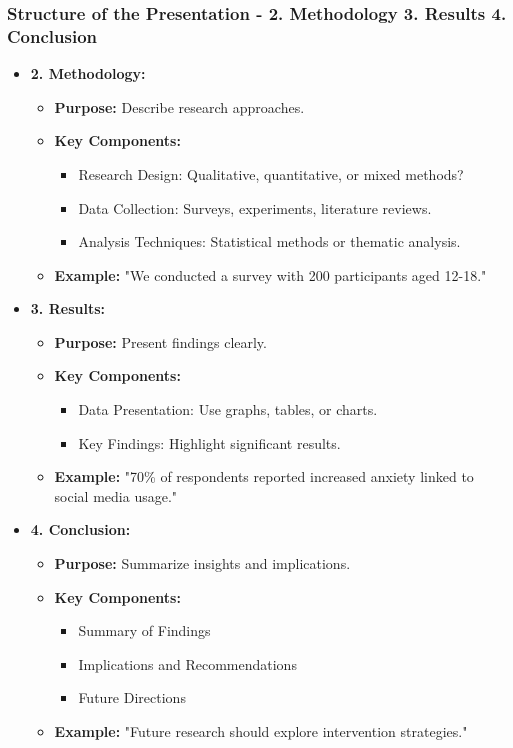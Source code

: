 \documentclass[aspectratio=169]{beamer}
\begin{document}
\begin{frame}[fragile]
    \frametitle{Structure of the Presentation - 2. Methodology 3. Results 4. Conclusion}
    \begin{itemize}
        \item \textbf{2. Methodology:}
        \begin{itemize}
            \item \textbf{Purpose:} Describe research approaches.
            \item \textbf{Key Components:}
            \begin{itemize}
                \item Research Design: Qualitative, quantitative, or mixed methods?
                \item Data Collection: Surveys, experiments, literature reviews.
                \item Analysis Techniques: Statistical methods or thematic analysis.
            \end{itemize}
            \item \textbf{Example:} "We conducted a survey with 200 participants aged 12-18."
        \end{itemize}
        \item \textbf{3. Results:}
        \begin{itemize}
            \item \textbf{Purpose:} Present findings clearly.
            \item \textbf{Key Components:}
            \begin{itemize}
                \item Data Presentation: Use graphs, tables, or charts.
                \item Key Findings: Highlight significant results.
            \end{itemize}
            \item \textbf{Example:} "70\% of respondents reported increased anxiety linked to social media usage."
        \end{itemize}
        \item \textbf{4. Conclusion:}
        \begin{itemize}
            \item \textbf{Purpose:} Summarize insights and implications.
            \item \textbf{Key Components:}
            \begin{itemize}
                \item Summary of Findings
                \item Implications and Recommendations
                \item Future Directions
            \end{itemize}
            \item \textbf{Example:} "Future research should explore intervention strategies."
        \end{itemize}
    \end{itemize}
\end{frame}
\end{document}
